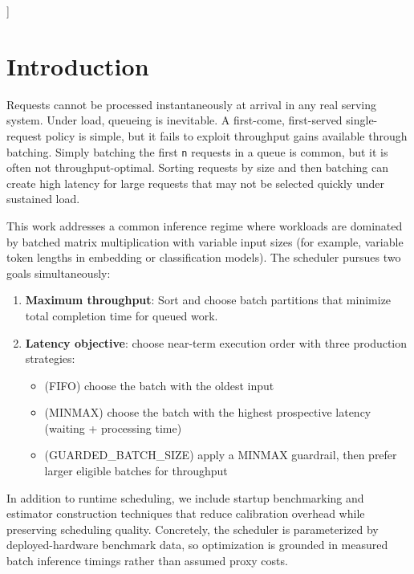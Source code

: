 \documentclass{article}
\providecommand{\tightlist}{\setlength{\itemsep}{0pt}\setlength{\parskip}{0pt}}
\begin{document}
]

\printAffiliationsAndNotice{}
\hypertarget{1-introduction}{%
\section{Introduction}\label{1-introduction}}

Requests cannot be processed instantaneously at arrival in any real
serving system. Under load, queueing is inevitable. A first-come,
first-served single-request policy is simple, but it fails to exploit
throughput gains available through batching. Simply batching the first
\texttt{n} requests in a queue is common, but it is often not
throughput-optimal. Sorting requests by size and then batching can
create high latency for large requests that may not be selected quickly
under sustained load.

This work addresses a common inference regime where workloads are
dominated by batched matrix multiplication with variable input sizes
(for example, variable token lengths in embedding or classification
models). The scheduler pursues two goals simultaneously:

\begin{enumerate}
\def\labelenumi{\arabic{enumi}.}
\tightlist
\item
  \textbf{Maximum throughput}: Sort and choose batch partitions that
  minimize total completion time for queued work.
\item
  \textbf{Latency objective}: choose near-term execution order with
  three production strategies:

  \begin{itemize}
  \tightlist
  \item
    (FIFO) choose the batch with the oldest input
  \item
    (MINMAX) choose the batch with the highest prospective latency
    (waiting + processing time)
  \item
    (GUARDED\_BATCH\_SIZE) apply a MINMAX guardrail, then prefer larger
    eligible batches for throughput
  \end{itemize}
\end{enumerate}

In addition to runtime scheduling, we include startup benchmarking and
estimator construction techniques that reduce calibration overhead while
preserving scheduling quality. Concretely, the scheduler is
parameterized by deployed-hardware benchmark data, so optimization is
grounded in measured batch inference timings rather than assumed proxy
costs.
\end{document}
